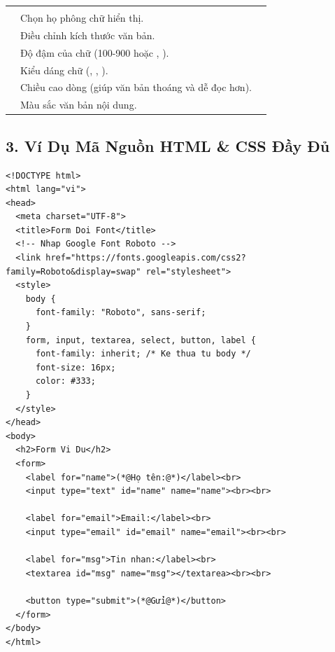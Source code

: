 \begin{prettyTableBox}
\begin{tabularx}{\linewidth}{K{2.6cm} Z K{3.2cm}}
 &  &  \\
 & Chọn họ phông chữ hiển thị. &  \\
 & Điều chỉnh kích thước văn bản. &  \\
 & Độ đậm của chữ (100-900 hoặc , ). &  \\
 & Kiểu dáng chữ (, , ). &  \\
 & Chiều cao dòng (giúp văn bản thoáng và dễ đọc hơn). &  \\
 & Màu sắc văn bản nội dung. &  \\
\end{tabularx}
\end{prettyTableBox}

\subsection{3. Ví Dụ Mã Nguồn HTML \& CSS Đầy Đủ}

\begin{codeWindow}
\begin{lstlisting}[language=HTML5]
<!DOCTYPE html>
<html lang="vi">
<head>
  <meta charset="UTF-8">
  <title>Form Doi Font</title>
  <!-- Nhap Google Font Roboto -->
  <link href="https://fonts.googleapis.com/css2?family=Roboto&display=swap" rel="stylesheet">
  <style>
    body {
      font-family: "Roboto", sans-serif;
    }
    form, input, textarea, select, button, label {
      font-family: inherit; /* Ke thua tu body */
      font-size: 16px;
      color: #333;
    }
  </style>
</head>
<body>
  <h2>Form Vi Du</h2>
  <form>
    <label for="name">(*@Họ tên:@*)</label><br>
    <input type="text" id="name" name="name"><br><br>
    
    <label for="email">Email:</label><br>
    <input type="email" id="email" name="email"><br><br>
    
    <label for="msg">Tin nhan:</label><br>
    <textarea id="msg" name="msg"></textarea><br><br>
    
    <button type="submit">(*@Gửi@*)</button>
  </form>
</body>
</html>
\end{lstlisting}
\end{codeWindow}

